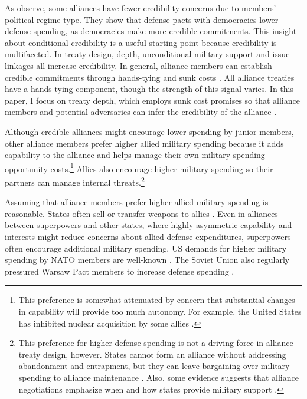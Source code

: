 \documentclass[12pt]{article}
\begin{document}
As \citet{DigiuseppePoast2016} observe, some alliances have fewer credibility concerns due to members' political regime type.
They show that defense pacts with democracies lower defense spending, as democracies make more credible commitments.
This insight about conditional credibility is a useful starting point because credibility is multifaceted. 
In treaty design, depth, unconditional military support \citep{Benson2012, Chibaetal2015} and issue linkages \citep{LongLeeds2006, Poast2012, Poast2013} all increase credibility.
In general, alliance members can establish credible commitments through hands-tying and sunk costs \citep{Fearon1997}. 
All alliance treaties have a hands-tying component, though the strength of this signal varies.
In this paper, I focus on treaty depth, which employs sunk cost promises so that alliance members and potential adversaries can infer the credibility of the alliance \citep{Leeds2003, FuhrmannSechser2014}. 


Although credible alliances might encourage lower spending by junior members, other alliance members prefer higher allied military spending because it adds capability to the alliance and helps manage their own military spending opportunity costs.\footnote{This preference is somewhat attenuated by concern that substantial changes in capability will provide too much autonomy. For example, the United States has inhibited nuclear acquisition by some allies \citep{Gavin2015, Lanoszka2015}.}
Allies also encourage higher military spending so their partners can manage internal threats.\footnote{
This preference for higher defense spending is not a driving force in alliance treaty design, however.
States cannot form an alliance without addressing abandonment and entrapment, but they can leave bargaining over military spending to alliance maintenance \citep{Snyder1997}.
Also, some evidence suggests that alliance negotiations emphasize when and how states provide military support \citep{Poast2019a}.} 


Assuming that alliance members prefer higher allied military spending is reasonable. 
States often sell or transfer weapons to allies \citep{Yarhi-Miloetal2016, Pampetal2018}. 
Even in alliances between superpowers and other states, where highly asymmetric capability and interests might reduce concerns about allied defense expenditures, superpowers often encourage additional military spending. 
US demands for higher military spending by NATO members are well-known \citep{SchuesslerShifrinson2019}.
The Soviet Union also regularly pressured Warsaw Pact members to increase defense spending \citep{Simon1985}. 
\end{document}
